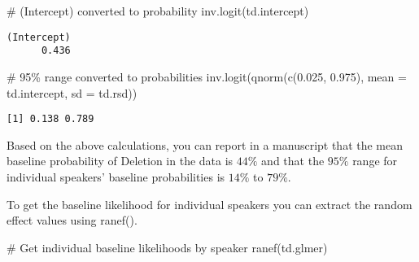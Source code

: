 \documentclass[
  10pt,
  letterpaper]{article}
\newenvironment{Shaded}{\begin{snugshade}}{\end{snugshade}}
\newcommand{\AttributeTok}[1]{\textcolor[rgb]{0.40,0.45,0.13}{#1}}
\newcommand{\CommentTok}[1]{\textcolor[rgb]{0.37,0.37,0.37}{#1}}
\newcommand{\FloatTok}[1]{\textcolor[rgb]{0.68,0.00,0.00}{#1}}
\newcommand{\FunctionTok}[1]{\textcolor[rgb]{0.28,0.35,0.67}{#1}}
\newcommand{\NormalTok}[1]{\textcolor[rgb]{0.00,0.23,0.31}{#1}}
\renewcommand\texttt[1]{{\ttfamily\color{BrickRed}#1}}
\begin{document}
\begin{Shaded}
\begin{Highlighting}[]
\CommentTok{\# (Intercept) converted to probability}
\FunctionTok{inv.logit}\NormalTok{(td.intercept)}
\end{Highlighting}
\end{Shaded}

\begin{verbatim}
(Intercept) 
      0.436 
\end{verbatim}

\begin{Shaded}
\begin{Highlighting}[]
\CommentTok{\# 95\% range converted to probabilities}
\FunctionTok{inv.logit}\NormalTok{(}\FunctionTok{qnorm}\NormalTok{(}\FunctionTok{c}\NormalTok{(}\FloatTok{0.025}\NormalTok{, }\FloatTok{0.975}\NormalTok{), }\AttributeTok{mean =}\NormalTok{ td.intercept,}
    \AttributeTok{sd =}\NormalTok{ td.rsd))}
\end{Highlighting}
\end{Shaded}

\begin{verbatim}
[1] 0.138 0.789
\end{verbatim}

Based on the above calculations, you can report in a manuscript that the
mean baseline probability of \texttt{Deletion} in the data is \(44\%\)
and that the \(95\%\) range for individual speakers' baseline
probabilities is \(14\%\) to \(79\%\).

To get the baseline likelihood for individual speakers you can extract
the random effect values using \texttt{ranef()}.

\begin{Shaded}
\begin{Highlighting}[]
\CommentTok{\# Get individual baseline likelihoods by speaker}
\FunctionTok{ranef}\NormalTok{(td.glmer)}
\end{Highlighting}
\end{Shaded}
\end{document}
